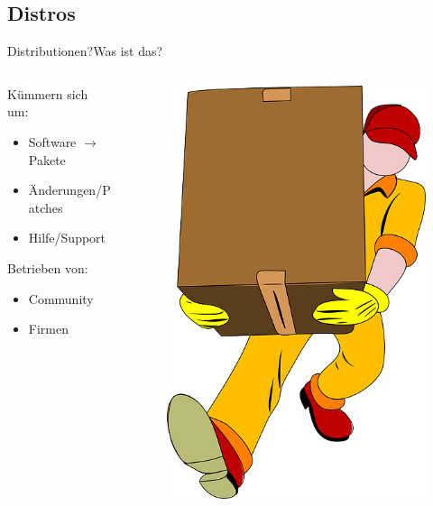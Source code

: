  



\subsection{Distros}
\begin{frame}{Distributionen?}{Was ist das?}
\begin{columns}
\begin{column}{0.45\textwidth}

Kümmern sich um:  
\begin{itemize}
 \item Software $\longrightarrow$ Pakete
 \item Änderungen/Patches
 \item Hilfe/Support 
\end{itemize}
 Betrieben von: 
\begin{itemize}
 \item Community
 \item Firmen
\end{itemize}
 \end{column}
\begin{column}{0.4\textwidth}
 \begin{figure}
 \includegraphics[height=0.5\textheight]{resources/movers-24402_640.png}

\end{figure}
\end{column}
\end{columns}
\end{frame}
